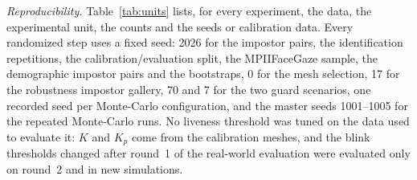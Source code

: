 \documentclass{ieeeaccess}
\begin{document}
\emph{Reproducibility.} Table~\ref{tab:units} lists, for every experiment, the data, the experimental unit, the counts and the seeds or calibration data. Every randomized step uses a fixed seed: 2026 for the impostor pairs, the identification repetitions, the calibration/evaluation split, the MPIIFaceGaze sample, the demographic impostor pairs and the bootstraps, 0 for the mesh selection, 17 for the robustness impostor gallery, 70 and 7 for the two guard scenarios, one recorded seed per Monte-Carlo configuration, and the master seeds 1001--1005 for the repeated Monte-Carlo runs. No liveness threshold was tuned on the data used to evaluate it: $K$ and $K_p$ come from the calibration meshes, and the blink thresholds changed after round~1 of the real-world evaluation were evaluated only on round~2 and in new simulations.
\end{document}
